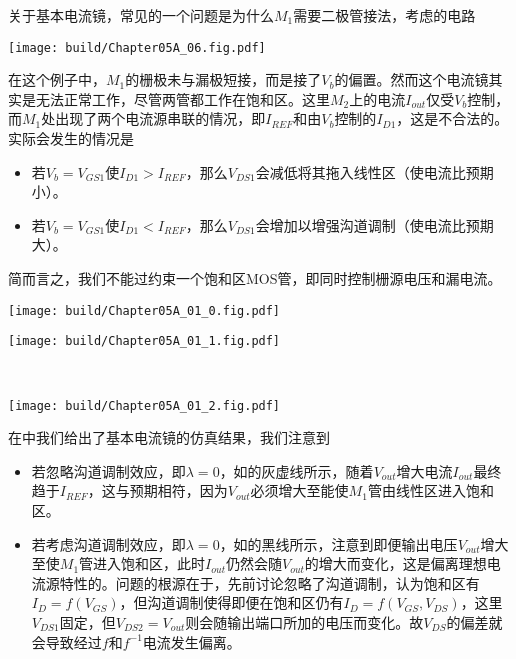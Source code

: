 关于基本电流镜，常见的一个问题是为什么$M_1$需要二极管接法，考虑的电路
\begin{Figure}[无效电流镜]
    \texttt{[image: build/Chapter05A\_06.fig.pdf]}
\end{Figure}
在这个例子中，$M_1$的栅极未与漏极短接，而是接了$V_b$的偏置。然而这个电流镜其实是无法正常工作，尽管两管都工作在饱和区。这里$M_2$上的电流$I_{out}$仅受$V_b$控制，而$M_1$处出现了两个电流源串联的情况，即$I_{REF}$和由$V_b$控制的$I_{D1}$，这是不合法的。实际会发生的情况是
\begin{itemize}
    \item 若$V_b=V_{GS1}$使$I_{D1}>I_{REF}$，那么$V_{DS1}$会减低将其拖入线性区（使电流比预期小）。
    \item 若$V_b=V_{GS1}$使$I_{D1}<I_{REF}$，那么$V_{DS1}$会增加以增强沟道调制（使电流比预期大）。
\end{itemize}
简而言之，我们不能过约束一个饱和区MOS管，即同时控制栅源电压和漏电流。

\begin{Figure}[基本电流镜的特性]
    \begin{FigureSub}
        \texttt{[image: build/Chapter05A\_01\_0.fig.pdf]}
    \end{FigureSub}
    \begin{FigureSub}
        \texttt{[image: build/Chapter05A\_01\_1.fig.pdf]}
    \end{FigureSub}\\ \vspace{0.25cm}
    \begin{FigureSub}
        \texttt{[image: build/Chapter05A\_01\_2.fig.pdf]}
    \end{FigureSub}
\end{Figure}
在中我们给出了基本电流镜的仿真结果，我们注意到
\begin{itemize}
    \item 若忽略沟道调制效应，即$\lambda=0$，如的灰虚线所示，随着$V_{out}$增大电流$I_{out}$最终趋于$I_{REF}$，这与预期相符，因为$V_{out}$必须增大至能使$M_1$管由线性区进入饱和区。
    \item 若考虑沟道调制效应，即$\lambda=0$，如的黑线所示，注意到即便输出电压$V_{out}$增大至使$M_1$管进入饱和区，此时$I_{out}$仍然会随$V_{out}$的增大而变化，这是偏离理想电流源特性的。问题的根源在于，先前讨论忽略了沟道调制，认为饱和区有$I_D=f(V_{GS})$，但沟道调制使得即便在饱和区仍有$I_D=f(V_{GS},V_{DS})$，这里$V_{DS1}$固定，但$V_{DS2}=V_{out}$则会随输出端口所加的电压而变化。故$V_{DS}$的偏差就会导致经过$f$和$f^{-1}$电流发生偏离。
\end{itemize}

